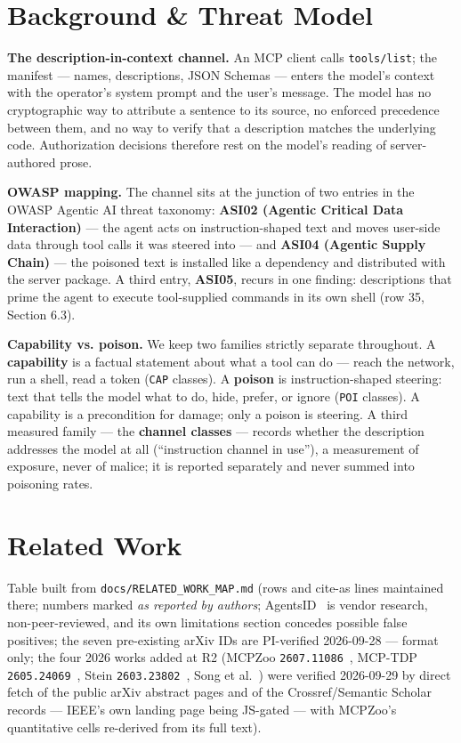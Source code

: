 \documentclass[10pt,conference]{IEEEtran}
\begin{document}
\section{Background \& Threat Model}

\textbf{The description-in-context channel.} An MCP client calls \texttt{tools/list}; the
manifest --- names, descriptions, JSON Schemas --- enters the model's context with the
operator's system prompt and the user's message. The model has no cryptographic way to
attribute a sentence to its source, no enforced precedence between them, and no way to
verify that a description matches the underlying code. Authorization decisions therefore
rest on the model's reading of server-authored prose.

\textbf{OWASP mapping.} The channel sits at the junction of two entries in the OWASP
Agentic AI threat taxonomy: \textbf{ASI02 (Agentic Critical Data Interaction)} --- the
agent acts on instruction-shaped text and moves user-side data through tool calls it was
steered into --- and \textbf{ASI04 (Agentic Supply Chain)} --- the poisoned text is
installed like a dependency and distributed with the server package. A third entry,
\textbf{ASI05}, recurs in one finding: descriptions that prime the agent to execute
tool-supplied commands in its own shell (row 35, Section 6.3).

\textbf{Capability vs. poison.} We keep two families strictly separate throughout. A
\textbf{capability} is a factual statement about what a tool can do --- reach the network,
run a shell, read a token (\texttt{CAP} classes). A \textbf{poison} is instruction-shaped
steering: text that tells the model what to do, hide, prefer, or ignore (\texttt{POI}
classes). A capability is a precondition for damage; only a poison is steering. A third
measured family --- the \textbf{channel classes} --- records whether the description
addresses the model at all (``instruction channel in use''), a measurement of exposure,
never of malice; it is reported separately and never summed into poisoning rates.

\section{Related Work}

Table built from \texttt{docs/RELATED\_WORK\_MAP.md} (rows and cite-as lines maintained
there; numbers marked \emph{as reported by authors}; AgentsID~\cite{agentsid} is vendor
research, non-peer-reviewed, and its own limitations section concedes possible false
positives; the seven pre-existing arXiv IDs are PI-verified 2026-09-28 --- format only; the
four 2026 works added at R2 (MCPZoo \texttt{2607.11086}~\cite{mcpzoo}, MCP-TDP
\texttt{2605.24069}~\cite{mcptdp}, Stein \texttt{2603.23802}~\cite{stein}, Song et
al.~\cite{song}) were verified 2026-09-29 by direct fetch of the public arXiv abstract
pages and of the Crossref/Semantic Scholar records --- IEEE's own landing page being
JS-gated --- with MCPZoo's quantitative cells re-derived from its full text).
\end{document}
